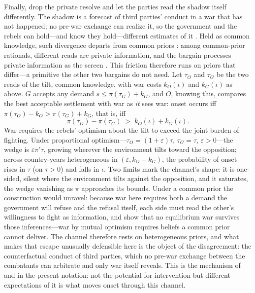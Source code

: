 Finally, drop the private resolve and let the parties read the shadow itself
differently.  The shadow is a forecast of third parties' conduct in a war that
has not happened; no pre-war exchange can realize it, so the government and
the rebels can hold---and know they hold---different estimates of it
\citep{cetinyan2002, thyne2006}.%
{}  Held as common knowledge, such divergence departs from common priors
\citep{aumann1976}: among common-prior rationals, different reads are private
information, and the bargain processes private information as the
screen \citep[cf.][]{slantchevtarar2011}.  This friction therefore runs on
priors that differ---a primitive the other two bargains do not need.  Let
$\tau_O$ and $\tau_G$ be the two reads of the tilt, common
knowledge, with war costs $k_O(\iota)$ and $k_G(\iota)$ as above.  $G$ accepts
any demand $s \le \pi(\tau_G) + k_G$, and $O$, knowing this, compares the best
acceptable settlement with war as \emph{it} sees war: onset occurs iff
$\pi(\tau_O) - k_O > \pi(\tau_G) + k_G$, that is, iff
\begin{equation}
  \pi(\tau_O) - \pi(\tau_G) \;>\; k_O(\iota) + k_G(\iota).
  \label{eq:wedge}
\end{equation}
War requires the rebels' optimism about the tilt to exceed the joint burden of
fighting.  Under proportional optimism---$\tau_O = (1+\varepsilon)\tau$,
$\tau_G = \tau$, $\varepsilon > 0$---the wedge is $\varepsilon \pi' \tau$,
growing wherever the environment tilts toward the opposition; across
country-years heterogeneous in $(\varepsilon, k_O + k_G)$, the probability of onset
rises in $\tau$ (on $\tau > 0$) and falls in $\iota$.  Two limits mark the
channel's shape: it is one-sided, silent where the environment tilts against
the opposition, and it saturates, the wedge vanishing as $\pi$ approaches its
bounds.  Under a common prior the construction would unravel: because war here
requires both a demand the government will refuse and the refusal itself,
each side must read the other's willingness to fight as information, and
\citet{feyramsay2007} show that no equilibrium war survives those
inferences---war by mutual optimism requires beliefs a common prior cannot
deliver.  The channel therefore rests on heterogeneous priors, and what makes
that escape unusually defensible here is the object of the disagreement: the
counterfactual conduct of third parties, which no pre-war exchange between
the combatants can arbitrate and only war itself reveals.  This is the mechanism of
\citet{cetinyan2002} and \citet{thyne2006} in the present notation: not the
potential for intervention but different expectations of it is what moves
onset through this channel.

